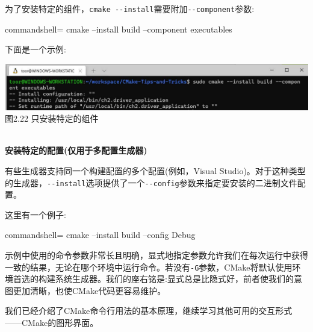 为了安装特定的组件，\texttt{cmake -{}-install}需要附加\texttt{-{}-component}参数:

\begin{tcblisting}{commandshell={}}
cmake --install build --component executables
\end{tcblisting}

下面是一个示例:

\begin{center}
\includegraphics[width=1.\textwidth]{content/1/chapter2/images/22.jpg}\\
图2.22 只安装特定的组件
\end{center}

\hspace*{\fill} \\ %
\noindent
\textbf{安装特定的配置(仅用于多配置生成器)}

有些生成器支持同一个构建配置的多个配置(例如，Visual Studio)。对于这种类型的生成器，\texttt{-{}-install}选项提供了一个\texttt{-{}-config}参数来指定要安装的二进制文件配置。

这里有一个例子:

\begin{tcblisting}{commandshell={}}
cmake --install build --config Debug
\end{tcblisting}

\begin{tcolorbox}[colback=webgreen!5!white,colframe=webgreen!75!black,title=Note]
示例中使用的命令参数非常长且明确，显式地指定参数允许我们在每次运行中获得一致的结果，无论在哪个环境中运行命令。若没有\texttt{-G}参数，CMake将默认使用环境首选的构建系统生成器。我们的座右铭是:显式总是比隐式好，前者使我们的意图更加清晰，也使CMake代码更容易维护。
\end{tcolorbox}

我们已经介绍了CMake命令行用法的基本原理，继续学习其他可用的交互形式——CMake的图形界面。











